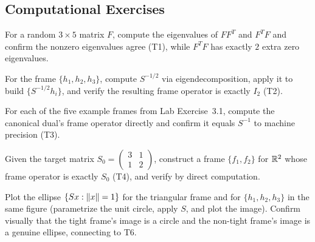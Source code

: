 \subsection*{Computational Exercises}
\begin{compexercises}
	\item For a random $3\times5$ matrix $F$, compute the eigenvalues of
	$FF^T$ and $F^TF$ and confirm the nonzero eigenvalues agree
	(T1), while $F^TF$ has exactly $2$ extra zero eigenvalues.
	
	\item For the frame $\{h_1,h_2,h_3\}$, compute $S^{-1/2}$ via
	eigendecomposition, apply it to build $\{S^{-1/2}h_i\}$, and
	verify the resulting frame operator is exactly $I_2$ (T2).
	
	\item For each of the five example frames from Lab Exercise~3.1,
	compute the canonical dual's frame operator directly and confirm
	it equals $S^{-1}$ to machine precision (T3).
	
	\item Given the target matrix $S_0=\begin{pmatrix}3&1\\1&2\end{pmatrix}$,
	construct a frame $\{f_1,f_2\}$ for $\mathbb{R}^2$ whose frame operator is
	exactly $S_0$ (T4), and verify by direct computation.
	
	\item Plot the ellipse $\{Sx:\left\| x \right\|=1\}$ for the triangular frame and
	for $\{h_1,h_2,h_3\}$ in the same figure (parametrize the unit
	circle, apply $S$, and plot the image). Confirm visually that the
	tight frame's image is a circle and the non-tight frame's image
	is a genuine ellipse, connecting to T6.
\end{compexercises}